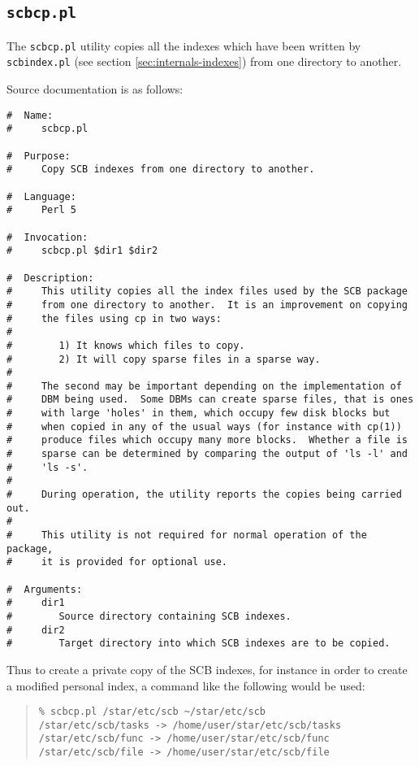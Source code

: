 \documentclass[twoside,11pt]{article}
\newcommand{\xlabel}[1]{}
\renewcommand{\_}{\texttt{\symbol{95}}}
\begin{document}
\subsection{\xlabel{sec:scbcp}\label{sec:scbcp}{\tt scbcp.pl}}

The {\tt scbcp.pl} utility copies all the indexes which have
been written by {\tt scbindex.pl} (see section \ref{sec:internals-indexes})
from one directory to another.

Source documentation is as follows:
\begin{verbatim}
#  Name:
#     scbcp.pl

#  Purpose:
#     Copy SCB indexes from one directory to another.

#  Language:
#     Perl 5

#  Invocation:
#     scbcp.pl $dir1 $dir2

#  Description:
#     This utility copies all the index files used by the SCB package
#     from one directory to another.  It is an improvement on copying
#     the files using cp in two ways:
#
#        1) It knows which files to copy.
#        2) It will copy sparse files in a sparse way.
#
#     The second may be important depending on the implementation of 
#     DBM being used.  Some DBMs can create sparse files, that is ones
#     with large 'holes' in them, which occupy few disk blocks but 
#     when copied in any of the usual ways (for instance with cp(1))
#     produce files which occupy many more blocks.  Whether a file is
#     sparse can be determined by comparing the output of 'ls -l' and 
#     'ls -s'.
#
#     During operation, the utility reports the copies being carried out.
#
#     This utility is not required for normal operation of the package,
#     it is provided for optional use.

#  Arguments:
#     dir1
#        Source directory containing SCB indexes.
#     dir2
#        Target directory into which SCB indexes are to be copied.
\end{verbatim}
Thus to create a private copy of the SCB indexes, for instance
in order to create a modified personal index, a command like the
following would be used:
\begin{quote}
\begin{verbatim}
% scbcp.pl /star/etc/scb ~/star/etc/scb
/star/etc/scb/tasks -> /home/user/star/etc/scb/tasks
/star/etc/scb/func -> /home/user/star/etc/scb/func
/star/etc/scb/file -> /home/user/star/etc/scb/file
\end{verbatim}
\end{quote}


\end{document}
